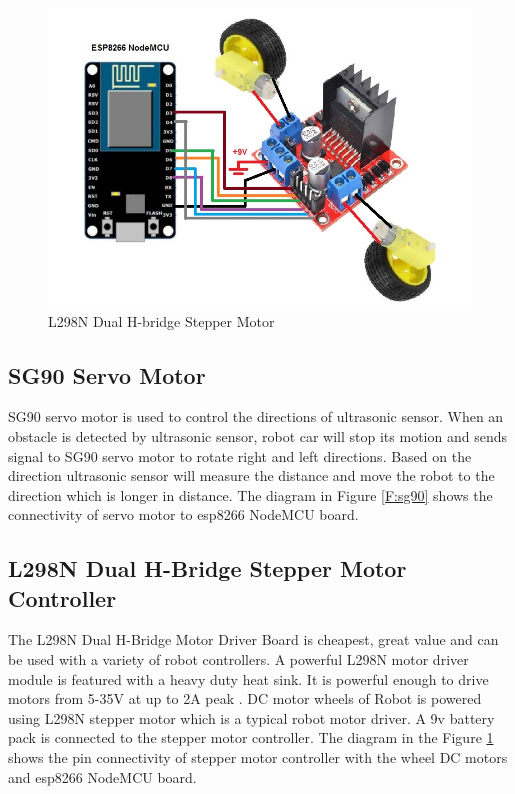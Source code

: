 \documentclass[sigconf]{acmart}
\begin{document}
\begin{figure}[htb]
	\includegraphics[width=1.0\columnwidth]{images/L298N_Hbridge.jpg}
	\caption{L298N Dual H-bridge Stepper Motor}\label{F:stepper}
\end{figure}

\subsection{SG90 Servo Motor}
SG90 servo motor is used to control the directions of ultrasonic
sensor. When an obstacle is detected by ultrasonic sensor, robot car
will stop its motion and sends signal to SG90 servo motor to rotate
right and left directions. Based on the direction ultrasonic sensor
will measure the distance and move the robot to the direction which is
longer in distance. The diagram in Figure \ref{F:sg90} shows the connectivity of servo motor to esp8266 NodeMCU board.


\subsection{L298N Dual H-Bridge Stepper Motor Controller}
The L298N Dual H-Bridge Motor Driver Board is cheapest, great value and can be used with a variety of robot controllers. A powerful L298N motor driver module is featured with a heavy duty heat sink. It is powerful enough to drive motors from 5-35V at up to 2A peak \cite{bananarobotics2013}.
DC motor wheels of Robot is powered using L298N stepper motor which is a typical robot motor driver. A 9v battery pack is connected to the stepper motor controller. The diagram in the Figure \ref{F:stepper} shows the pin connectivity of stepper motor controller with the wheel DC motors and esp8266 NodeMCU board.
\end{document}
